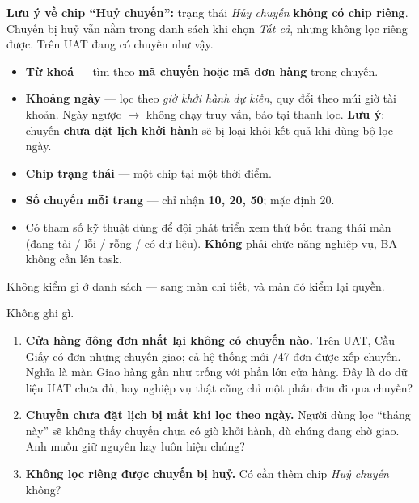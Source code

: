 \textbf{Lưu ý về chip ``Huỷ chuyến'':} trạng thái \emph{Hủy chuyến} \textbf{không có chip
riêng}. Chuyến bị huỷ vẫn nằm trong danh sách khi chọn \emph{Tất cả}, nhưng không lọc riêng
được. Trên UAT đang có  chuyến như vậy.

\mloc

\begin{itemize}[leftmargin=*]
  \item \textbf{Từ khoá} --- tìm theo \textbf{mã chuyến} \textbf{hoặc} \textbf{mã đơn hàng}
        trong chuyến.
  \item \textbf{Khoảng ngày} --- lọc theo \emph{giờ khởi hành dự kiến}, quy đổi theo múi giờ
        tài khoản. Ngày ngược $\rightarrow$ không chạy truy vấn, báo tại thanh lọc.
        \textbf{Lưu ý}: chuyến \textbf{chưa đặt lịch khởi hành} sẽ bị loại khỏi kết quả khi
        dùng bộ lọc ngày.
  \item \textbf{Chip trạng thái} --- một chip tại một thời điểm.
  \item \textbf{Số chuyến mỗi trang} --- chỉ nhận \textbf{10, 20, 50}; mặc định 20.
  \item Có tham số kỹ thuật  dùng để đội phát triển xem thử bốn trạng thái màn
        (đang tải / lỗi / rỗng / có dữ liệu). \textbf{Không} phải chức năng nghiệp vụ, BA không
        cần lên task.
\end{itemize}


Không kiểm gì ở danh sách --- sang màn chi tiết, và màn đó kiểm lại quyền.

\mghi

Không ghi gì.

\mhoi

\begin{ask}
\begin{enumerate}[leftmargin=*]
  \item \textbf{Cửa hàng đông đơn nhất lại không có chuyến nào.} Trên UAT, Cầu Giấy có 
        đơn nhưng  chuyến giao; cả hệ thống mới /47 đơn được xếp chuyến. Nghĩa là
        màn Giao hàng gần như trống với phần lớn cửa hàng. Đây là do dữ liệu UAT chưa đủ, hay
        nghiệp vụ thật cũng chỉ một phần đơn đi qua chuyến?
  \item \textbf{Chuyến chưa đặt lịch bị mất khi lọc theo ngày.} Người dùng lọc ``tháng này'' sẽ
        không thấy chuyến chưa có giờ khởi hành, dù chúng đang chờ giao. Anh muốn giữ nguyên
        hay luôn hiện chúng?
  \item \textbf{Không lọc riêng được chuyến bị huỷ.} Có cần thêm chip \emph{Huỷ chuyến} không?
\end{enumerate}
\end{ask}


